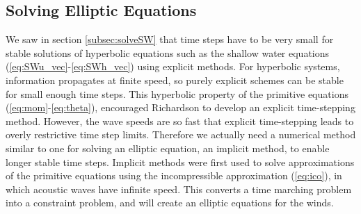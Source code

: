 \subsection{Solving Elliptic Equations}\label{subsec:ellipticSolutions}

We saw in section \ref{subsec:solveSW} that time steps have to be
very small for stable solutions of hyperbolic equations such as the
shallow water equations (\ref{eq:SWu_vec}-\ref{eq:SWh_vec}) using
explicit methods. For hyperbolic systems, information propagates at
finite speed, so purely explicit schemes can be stable for small enough
time steps. This hyperbolic property of the primitive equations (\ref{eq:mom}-\ref{eq:theta}),
encouraged Richardson to develop an explicit time-stepping method.
However, the wave speeds are so fast that explicit time-stepping leads
to overly restrictive time step limits. Therefore we actually need
a numerical method similar to one for solving an elliptic equation,
an implicit method, to enable longer stable time steps. Implicit methods
were first used to solve approximations of the primitive equations
using the incompressible approximation (\ref{eq:ico}), in which acoustic
waves have infinite speed. This converts a time marching problem into
a constraint problem, and will create an elliptic equations for the
winds.

